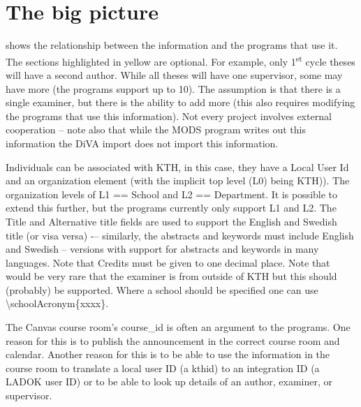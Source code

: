 \section{The big picture}

 shows the relationship between the information and the programs that use it. The sections highlighted in yellow are optional. For example, only 1\textsuperscript{st} cycle theses will have a second author. While all theses will have one supervisor, some may have more (the programs support up to 10). The assumption is that there is a single examiner, but there is the ability to add more (this also requires modifying the programs that use this information). Not every project involves external cooperation – note also that while the MODS program writes out this information the DiVA import does not import this information.

Individuals can be associated with KTH, in this case, they have a Local User Id and an organization element (with the implicit top level (L0) being KTH)). The organization levels of L1 == School and L2 == Department. It is possible to extend this further, but the programs currently only support L1 and L2. The Title and Alternative title fields are used to support the English and Swedish title (or visa versa) -– similarly, the abstracts and keywords must include English and Swedish – versions with support for abstracts and keywords in many languages. Note that Credits must be given to one decimal place.
Note that would be very rare that the examiner is from outside of KTH but this should (probably) be supported. Where a school should be specified one can use \textbackslash schoolAcronym\{xxxx\}.

The Canvas course room’s course\_id is often an argument to the programs. One reason for this is to publish the announcement in the correct course room and calendar. Another reason for this is to be able to use the information in the course room to translate a local user ID (\ie a kthid) to an integration ID (\ie a LADOK user ID) or to be able to look up details of an author, examiner, or supervisor.



